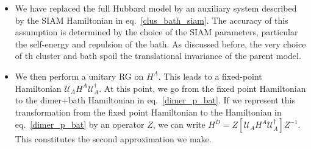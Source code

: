 \documentclass{report}
\numberwithin{equation}{section}
\begin{document}
 \begin{itemize}
 	\item We have replaced the full Hubbard model by an auxiliary system described by the SIAM Hamiltonian in eq.~\ref{clus_bath_siam}. The accuracy of this assumption is determined by the choice of the SIAM parameters, particular the self-energy and repulsion of the bath. As discussed before, the very choice of th cluster and bath spoil the translational invariance of the parent model.
 	\item We then perform a unitary RG on $H^A$. This leads to a fixed-point Hamiltonian $\mathcal{U}_A H^A \mathcal{U}_A^\dagger$. At this point, we go from the fixed point Hamiltonian to the dimer+bath Hamiltonian in eq.~\ref{dimer_p_bat}. If we represent this transformation from the fixed point Hamiltonian to the Hamiltonian in eq.~\ref{dimer_p_bat} by an operator \(Z\), we can write $H^D = Z\left[\mathcal{U}_A H^A \mathcal{U}_A^\dagger \right] Z^{-1}$. This constitutes the second approximation we make.
 \end{itemize}
\end{document}
